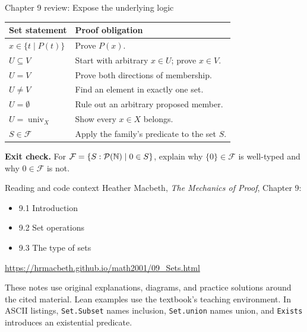 \begin{frame}{Chapter 9 review: Expose the underlying logic}
\begin{center}
\begin{tabular}{p{}p{}}
\toprule
Set statement & Proof obligation\\\midrule
$x\in\{t\mid P(t)\}$ & Prove $P(x)$.\\
$U\subseteq V$ & Start with arbitrary $x\in U$; prove $x\in V$.\\
$U=V$ & Prove both directions of membership.\\
$U\ne V$ & Find an element in exactly one set.\\
$U=\emptyset$ & Rule out an arbitrary proposed member.\\
$U=\operatorname{univ}_X$ & Show every $x\in X$ belongs.\\
$S\in\mathcal F$ & Apply the family's predicate to the set $S$.\\
\bottomrule
\end{tabular}
\end{center}
\textbf{Exit check.} For $\mathcal F=\{S:\mathcal P(\mathbb{N})\mid0\in S\}$,
explain why $\{0\}\in\mathcal F$ is well-typed and why $0\in\mathcal F$ is not.
\end{frame}

\begin{frame}{Reading and code context}
Heather Macbeth, \emph{The Mechanics of Proof}, Chapter 9:
\begin{itemize}
\item 9.1 Introduction
\item 9.2 Set operations
\item 9.3 The type of sets
\end{itemize}
\url{https://hrmacbeth.github.io/math2001/09_Sets.html}
\medskip

These notes use original explanations, diagrams, and practice solutions around the cited material.
Lean examples use the textbook's teaching environment. In ASCII listings,
\texttt{Set.Subset} names inclusion, \texttt{Set.union} names union, and
\texttt{Exists} introduces an existential predicate.
\end{frame}

